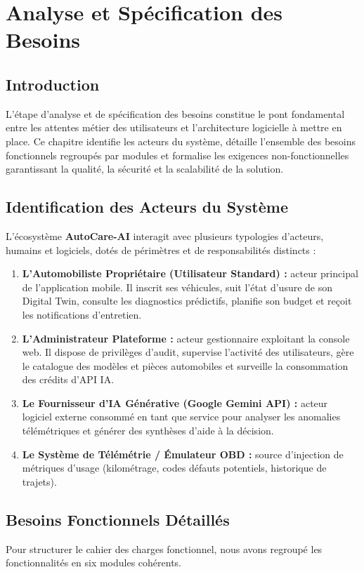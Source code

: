 \documentclass[12pt,a4paper,twoside,openright]{report}
\begin{document}
  \chapter{Analyse et Sp\'ecification des Besoins}

  \section{Introduction}
  L'\'etape d'analyse et de sp\'ecification des besoins constitue le pont fondamental entre les attentes m\'etier des utilisateurs et l'architecture logicielle \`a mettre en place. Ce chapitre identifie les acteurs du syst\`eme, d\'etaille l'ensemble des besoins fonctionnels regroup\'es par modules et formalise les exigences non-fonctionnelles garantissant la qualit\'e, la s\'ecurit\'e et la scalabilit\'e de la solution.

  \section{Identification des Acteurs du Syst\`eme}
  L'\'ecosyst\`eme \textbf{AutoCare-AI} interagit avec plusieurs typologies d'acteurs, humains et logiciels, dot\'es de p\'erim\`etres et de responsabilit\'es distincts :
  \begin{enumerate}
    \item \textbf{L'Automobiliste Propri\'etaire (Utilisateur Standard) :} acteur principal de l'application mobile. Il inscrit ses v\'ehicules, suit l'\'etat d'usure de son Digital Twin, consulte les diagnostics pr\'edictifs, planifie son budget et re\c{c}oit les notifications d'entretien.
    \item \textbf{L'Administrateur Plateforme :} acteur gestionnaire exploitant la console web. Il dispose de privil\`eges d'audit, supervise l'activit\'e des utilisateurs, g\`ere le catalogue des mod\`eles et pi\`eces automobiles et surveille la consommation des cr\'edits d'API IA.
    \item \textbf{Le Fournisseur d'IA G\'en\'erative (Google Gemini API) :} acteur logiciel externe consomm\'e en tant que service pour analyser les anomalies t\'el\'em\'etriques et g\'en\'erer des synth\`eses d'aide \`a la d\'ecision.
    \item \textbf{Le Syst\`eme de T\'el\'em\'etrie / \'Emulateur OBD :} source d'injection de m\'etriques d'usage (kilom\'etrage, codes d\'efauts potentiels, historique de trajets).
  \end{enumerate}

  \section{Besoins Fonctionnels D\'etaill\'es}
  Pour structurer le cahier des charges fonctionnel, nous avons regroup\'e les fonctionnalit\'es en six modules coh\'erents.
\end{document}
